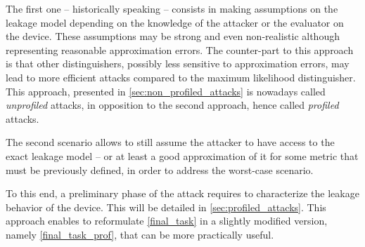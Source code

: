 The first one -- historically speaking -- consists in making assumptions on the leakage model depending on the knowledge of the attacker or the evaluator on the device.
These assumptions may be strong and even non-realistic although representing reasonable approximation errors.
The counter-part to this approach is that other distinguishers, possibly less sensitive to approximation errors, may lead to more efficient attacks compared to the maximum likelihood distinguisher.
This approach, presented in \autoref{sec:non_profiled_attacks} is nowadays called \emph{unprofiled} attacks, in opposition to the second approach, hence called \emph{profiled} attacks.

The second scenario allows to still assume the attacker to have access to the exact leakage model -- or at least a good approximation of it for some metric that must be previously defined, in order to address the worst-case scenario.

To this end, a preliminary phase of the attack requires to characterize the leakage behavior of the device.
This will be detailed in \autoref{sec:profiled_attacks}.
This approach enables to reformulate \autoref{final_task} in a slightly modified version, namely \autoref{final_task_prof}, that can be more practically useful.
